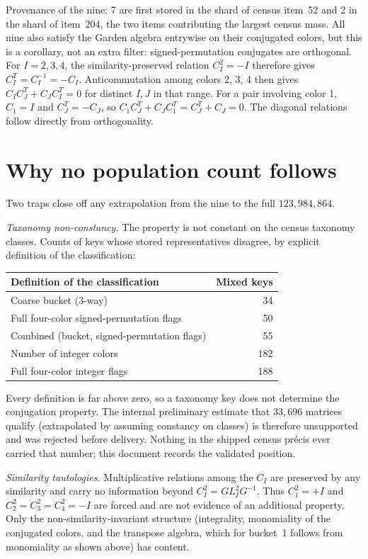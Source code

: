 \documentclass[11pt]{article}
\begin{document}
Provenance of the nine: 7 are first stored in the shard of census item~52 and
2 in the shard of item~204, the two items contributing the largest census
mass.  All nine also satisfy the Garden algebra entrywise on their conjugated
colors, but this is a corollary, not an extra filter: signed-permutation
conjugates are orthogonal.  For $I=2,3,4$, the similarity-preserved relation
$C_I^2=-I$ therefore gives $C_I^T=C_I^{-1}=-C_I$.  Anticommutation among
colors 2, 3, 4 then gives
$C_I C_J^{T} + C_J C_I^{T}=0$ for distinct $I,J$ in that range.  For a pair
involving color 1, $C_1=I$ and $C_J^T=-C_J$, so
$C_1C_J^T+C_JC_1^T=C_J^T+C_J=0$.  The diagonal relations follow directly
from orthogonality.

\section{Why no population count follows}

Two traps close off any extrapolation from the nine to the full
$123{,}984{,}864$.

\emph{Taxonomy non-constancy.}  The property is not constant on the census
taxonomy classes.  Counts of keys whose stored representatives disagree, by
explicit definition of the classification:

\begin{center}
\small
\begin{tabular}{@{}lr@{}}
\toprule
Definition of the classification & Mixed keys \\
\midrule
Coarse bucket (3-way) & 34 \\
Full four-color signed-permutation flags & 50 \\
Combined (bucket, signed-permutation flags) & 55 \\
Number of integer colors & 182 \\
Full four-color integer flags & 188 \\
\bottomrule
\end{tabular}
\end{center}

Every definition is far above zero, so a taxonomy key does not determine the
conjugation property.  The internal preliminary estimate that $33{,}696$
matrices qualify (extrapolated by assuming constancy on classes) is therefore
unsupported and was rejected before delivery.  Nothing in the shipped census
pr\'ecis ever carried that number; this document records the validated
position.

\emph{Similarity tautologies.}  Multiplicative relations among the $C_I$ are
preserved by any similarity and carry no information beyond
$C_I^2=G L_I^2G^{-1}$.  Thus $C_1^2=+I$ and
$C_2^2=C_3^2=C_4^2=-I$ are forced and are not evidence of an additional
property.  Only the non-similarity-invariant structure (integrality,
monomiality of the conjugated colors, and the transpose algebra, which for
bucket~1 follows from monomiality as shown above) has content.
\end{document}
